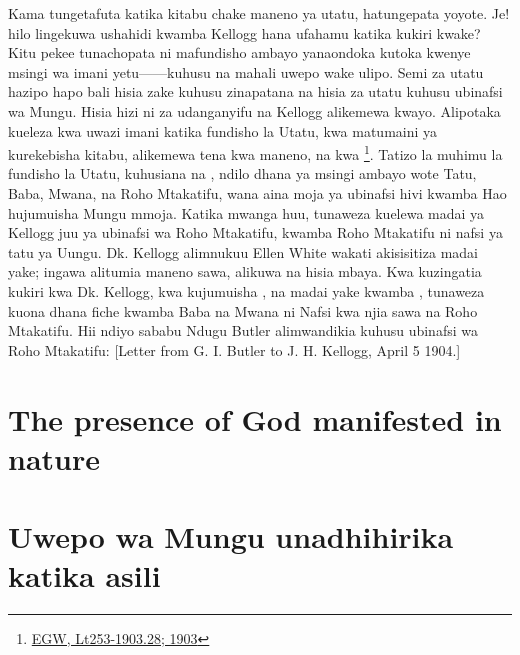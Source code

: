 Kama tungetafuta katika kitabu chake maneno ya utatu, hatungepata yoyote. Je! hilo lingekuwa ushahidi kwamba Kellogg hana ufahamu katika kukiri kwake? Kitu pekee tunachopata ni mafundisho ambayo yanaondoka kutoka kwenye msingi wa imani yetu——kuhusu  na mahali uwepo wake ulipo. Semi za utatu hazipo hapo bali hisia zake kuhusu  zinapatana na hisia za utatu kuhusu ubinafsi wa Mungu. Hisia hizi ni za udanganyifu na Kellogg alikemewa kwayo. Alipotaka kueleza kwa uwazi imani katika fundisho la Utatu, kwa matumaini ya kurekebisha kitabu, alikemewa tena kwa maneno,  na kwa \footnote{\href{https://egwwritings.org/?ref=en_Lt253-1903.28&para=9980.36}{EGW, Lt253-1903.28; 1903}}. Tatizo la muhimu la fundisho la Utatu, kuhusiana na , ndilo dhana ya msingi ambayo wote Tatu, Baba, Mwana, na Roho Mtakatifu, wana aina moja ya ubinafsi hivi kwamba Hao hujumuisha Mungu mmoja. Katika mwanga huu, tunaweza kuelewa madai ya Kellogg juu ya ubinafsi wa Roho Mtakatifu, kwamba Roho Mtakatifu ni nafsi ya tatu ya Uungu. Dk. Kellogg alimnukuu Ellen White wakati akisisitiza madai yake; ingawa alitumia maneno sawa, alikuwa na hisia mbaya. Kwa kuzingatia kukiri kwa Dk. Kellogg, kwa kujumuisha , na madai yake kwamba , tunaweza kuona dhana fiche kwamba Baba na Mwana ni Nafsi kwa njia sawa na Roho Mtakatifu. Hii ndiyo sababu Ndugu Butler alimwandikia kuhusu ubinafsi wa Roho Mtakatifu: [Letter from G. I. Butler to J. H. Kellogg, April 5 1904.]


\section*{The presence of God manifested in nature}


\section*{Uwepo wa Mungu unadhihirika katika asili}


